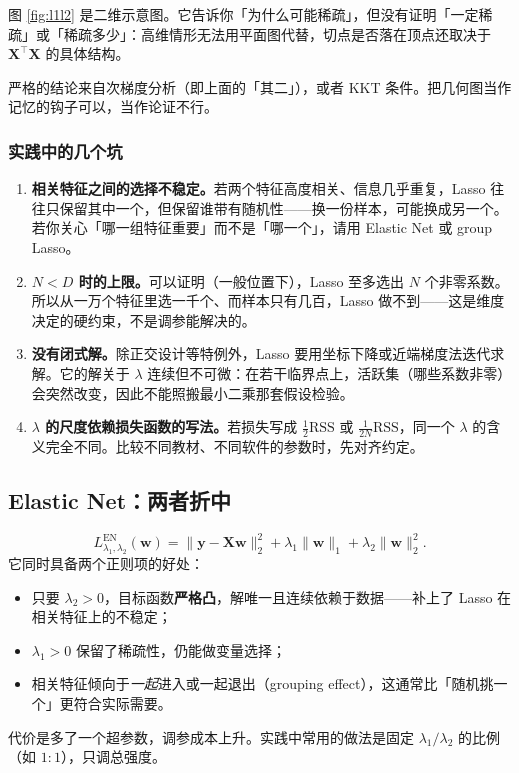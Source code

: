 \documentclass[11pt,a4paper,fontset=windows,zihao=-4]{ctexart}
\newcommand{\bX}{\mathbf{X}}
\newcommand{\by}{\mathbf{y}}
\newcommand{\bw}{\mathbf{w}}
\newcommand{\tp}{^{\top}}
\newcommand{\norm}[1]{\lVert #1\rVert}
\begin{document}
\begin{warn}
图 \ref{fig:l1l2} 是二维示意图。它告诉你「为什么可能稀疏」，但没有证明「一定稀疏」或「稀疏多少」：高维情形无法用平面图代替，切点是否落在顶点还取决于 $\bX\tp\bX$ 的具体结构。

严格的结论来自次梯度分析（即上面的「其二」），或者 KKT 条件。把几何图当作记忆的钩子可以，当作论证不行。
\end{warn}

\subsubsection{实践中的几个坑}

\begin{enumerate}[label=(\arabic*)]
  \item \textbf{相关特征之间的选择不稳定。}若两个特征高度相关、信息几乎重复，Lasso 往往只保留其中一个，但保留谁带有随机性——换一份样本，可能换成另一个。若你关心「哪一组特征重要」而不是「哪一个」，请用 Elastic Net 或 group Lasso。
  \item \textbf{$N<D$ 时的上限。}可以证明（一般位置下），Lasso 至多选出 $N$ 个非零系数。所以从一万个特征里选一千个、而样本只有几百，Lasso 做不到——这是维度决定的硬约束，不是调参能解决的。
  \item \textbf{没有闭式解。}除正交设计等特例外，Lasso 要用坐标下降或近端梯度法迭代求解。它的解关于 $\lambda$ 连续但不可微：在若干临界点上，活跃集（哪些系数非零）会突然改变，因此不能照搬最小二乘那套假设检验。
  \item \textbf{$\lambda$ 的尺度依赖损失函数的写法。}若损失写成 $\frac{1}{2}\text{RSS}$ 或 $\frac{1}{2N}\text{RSS}$，同一个 $\lambda$ 的含义完全不同。比较不同教材、不同软件的参数时，先对齐约定。
\end{enumerate}

\subsection{Elastic Net：两者折中}

\begin{equation}
  L^{\text{EN}}_{\lambda_1,\lambda_2}(\bw)
  =\norm{\by-\bX\bw}_2^2+\lambda_1\norm{\bw}_1+\lambda_2\norm{\bw}_2^2 .
  \label{eq:enet}
\end{equation}
它同时具备两个正则项的好处：
\begin{itemize}
  \item 只要 $\lambda_2>0$，目标函数\textbf{严格凸}，解唯一且连续依赖于数据——补上了 Lasso 在相关特征上的不稳定；
  \item $\lambda_1>0$ 保留了稀疏性，仍能做变量选择；
  \item 相关特征倾向于\emph{一起}进入或一起退出（grouping effect），这通常比「随机挑一个」更符合实际需要。
\end{itemize}
代价是多了一个超参数，调参成本上升。实践中常用的做法是固定 $\lambda_1/\lambda_2$ 的比例（如 $1:1$），只调总强度。
\end{document}

